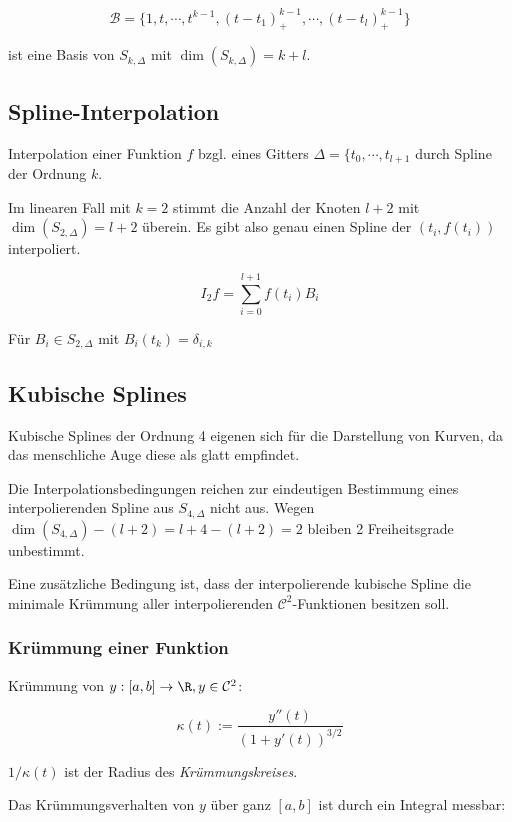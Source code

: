 $$\mathcal{B} = \{1,t,\cdots,t^{k-1},(t-t_1)_+^{k-1},\cdots,(t-t_l)_+^{k-1}\}$$

ist eine Basis von $S_{k,\Delta}$ mit $\dim(S_{k,\Delta}) = k + l$.

\subsection*{Spline-Interpolation}

Interpolation einer Funktion $f$ bzgl. eines Gitters $\Delta = \{t_0,\cdots,t_{l+1}$ durch Spline der Ordnung $k$.

\vspace{2mm}

Im linearen Fall mit $k=2$ stimmt die Anzahl der Knoten $l+2$ mit $\dim(S_{2,\Delta})=l+2$ überein. Es gibt also genau einen Spline der $(t_i,f(t_i))$ interpoliert.

$$I_2 f = \sum_{i=0}^{l+1} f(t_i) B_i$$

Für $B_i \in S_{2,\Delta}$ mit $B_i(t_k) = \delta_{i,k}$

\subsection*{Kubische Splines}

Kubische Splines der Ordnung 4 eigenen sich für die Darstellung von Kurven, da das menschliche Auge diese als glatt empfindet.

\vspace{2mm}

Die Interpolationsbedingungen reichen zur eindeutigen Bestimmung eines interpolierenden Spline aus $S_{4,\Delta}$ nicht aus. Wegen $\dim(S_{4,\Delta}) - (l+2) = l+4-(l+2) = 2$ bleiben 2 Freiheitsgrade unbestimmt.

Eine zusätzliche Bedingung ist, dass der interpolierende kubische Spline die minimale Krümmung aller interpolierenden $\mathcal{C}^2$-Funktionen besitzen soll.

\subsubsection*{Krümmung einer Funktion}

Krümmung von $y : [a,b] \rightarrow \R, y \in \mathcal{C}^2$:

$$\kappa(t) := \frac{y''(t)}{(1+y'(t))^{3/2}}$$

$1/\kappa(t)$ ist der Radius des \emph{Krümmungskreises}.

Das Krümmungsverhalten von $y$ über ganz $[a,b]$ ist durch ein Integral messbar:

